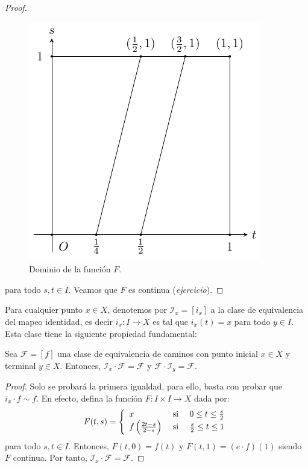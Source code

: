 \documentclass[12pt]{report}
\theoremstyle{largebreak}
\newcommand\cf[3]{\ensuremath{#1:#2\rightarrow#3}}
\begin{document}
\begin{proof}
        \begin{figure}
            \begin{center}
                \includegraphics[scale=1]{images/fig_1.pdf}
            \end{center}
            \caption{Dominio de la función $F$.}
        \end{figure}

        para todo $s,t\in I$. Veamos que $F$ es continua (\textit{ejercicio}).
    \end{proof}

    Para cualquier punto $x\in X$, denotemos por $\mathscr{I}_x=[i_x]$ a la clase de equivalencia del mapeo identidad, es decir $\cf{i_x}{I}{X}$ es tal que $i_x(t)=x$ para todo $y\in I$. Esta clase tiene la siguiente propiedad fundamental:

    \begin{lema}
        Sea $\mathscr{F}=[f]$ una clase de equivalencia de caminos con punto inicial $x\in X$ y terminal $y\in X$. Entonces, $\mathscr{I}_x\cdot\mathscr{F}=\mathscr{F}$ y $\mathscr{F}\cdot\mathscr{I}_y=\mathscr{F}$.
    \end{lema}

    \begin{proof}
        Solo se probará la primera igualdad, para ello, basta con probar que $i_x\cdot f\sim f$. En efecto, defina la función $\cf{F}{I\times I}{X}$ dada por:
        \begin{equation*}
            F(t,s)=\left\{
                \begin{array}{lcr}
                    x & \textup{ si } & 0\leq t\leq\frac{s}{2}\\
                    f\left(\frac{2t-s}{2-s}\right) & \textup{ si } & \frac{s}{2}\leq t\leq 1\\
                \end{array}
            \right.
        \end{equation*}
        para todo $s,t\in I$. Entonces, $F(t,0)=f(t)$ y $F(t,1)=(e\cdot f)(1)$ siendo $F$ continua. Por tanto, $\mathscr{I}_x\cdot\mathscr{F}=\mathscr{F}$.
    \end{proof}
\end{document}
